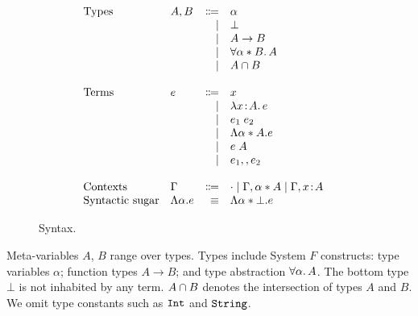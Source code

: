 \begin{figure}
  \[
    \begin{array}{l}
      \begin{array}{llrll}
        \text{Types}
        & A, B & \Coloneqq & \alpha                  & \\
        &      & \mid & \bot                         & \\
        &      & \mid & A \to B                      & \\
        &      & \mid & \forall \alpha * B. \, A  & \\
        &      & \mid & A \cap B               & \\

        \\
        \text{Terms}
        & e & \Coloneqq & x                        & \\
        &   & \mid & \lambda x \!:\! A.\, e                    & \\
        &   & \mid & e_1 \; e_2              & \\
        &   & \mid & \Lambda \alpha * A. e  & \\
        &   & \mid & e \; A                     & \\
        &   & \mid & e_1 ,, e_2              & \\

        \\
        \text{Contexts}
        & \Gamma & \Coloneqq & \cdot
                   \mid \Gamma, \alpha * A
                   \mid \Gamma, x \!:\! A  & \\

        \text{Syntactic sugar} & \Lambda \alpha. e & \equiv & \Lambda \alpha * \bot. e & \\
      \end{array}
    \end{array}
  \]

  \label{fig:fi-syntax}
  \caption{Syntax.}
\end{figure}


Meta-variables $A$, $B$ range over types. Types include System $F$ constructs:
type variables $\alpha$; function types $A \to B$; and type
abstraction $\forall \alpha. \, A$. The bottom type $\bot$ is not inhabited by any
term. $A \cap B$ denotes the intersection of types $A$ and
$B$. We omit type constants such as $\texttt {Int}$ and $\texttt {String}$.

